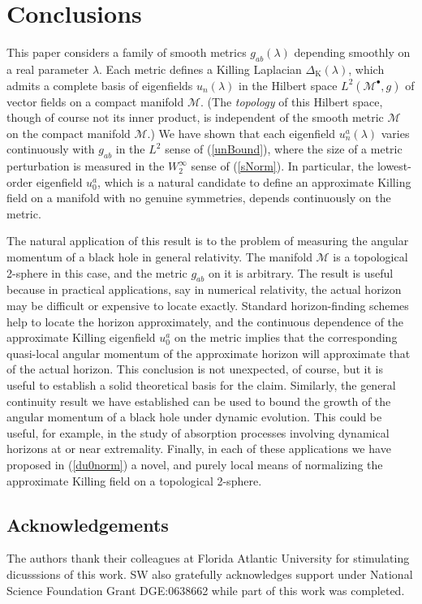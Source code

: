 \documentclass[12pt,letterpaper]{iopart}
\newcommand\Lap[1][K]{\Delta_{\scriptscriptstyle\mathrm{#1}}}
\newcommand\M{\mathcal{M}}
\newcommand\ind{{\bullet}}
\begin{document}
\section{Conclusions}

This paper considers a family of smooth metrics $g_{ab}(\lambda)$ depending smoothly on a real parameter $\lambda$.  Each metric defines a Killing Laplacian $\Lap(\lambda)$, which admits a complete basis of eigenfields $u_n(\lambda)$ in the Hilbert space $L^2(\M^\ind, g)$ of vector fields on a compact manifold $\M$.  (The \textit{topology} of this Hilbert space, though of course not its inner product, is independent of the smooth metric $\M$ on the compact manifold $\M$.)  We have shown that each eigenfield $u_n^a(\lambda)$ varies continuously with $g_{ab}$ in the $L^2$ sense of (\ref{unBound}), where the size of a metric perturbation is measured in the $W_2^\infty$ sense of (\ref{sNorm}).  In particular, the lowest-order eigenfield $u_0^a$, which is a natural candidate to define an approximate Killing field on a manifold with no genuine symmetries, depends continuously on the metric.

The natural application of this result is to the problem of measuring the angular momentum of a black hole in general relativity.  The manifold $\M$ is a topological 2-sphere in this case, and the metric $g_{ab}$ on it is arbitrary.  The result is useful because in practical applications, say in numerical relativity, the actual horizon may be difficult or expensive to locate exactly.  Standard horizon-finding schemes \cite{Thornburg} help to locate the horizon approximately, and the continuous dependence of the approximate Killing eigenfield $u_0^a$ on the metric implies that the corresponding quasi-local angular momentum of the approximate horizon will approximate that of the actual horizon.  This conclusion is not unexpected, of course, but it is useful to establish a solid theoretical basis for the claim.  Similarly, the general continuity result we have established can be used to bound the growth of the angular momentum of a black hole under dynamic evolution.  This could be useful, for example, in the study of absorption processes involving dynamical horizons \cite{Ashtekar2004} at or near extremality.  Finally, in each of these applications we have proposed in (\ref{du0norm}) a novel, and purely local means of normalizing the approximate Killing field on a topological 2-sphere.  


\subsection*{Acknowledgements}
The authors thank their colleagues at Florida Atlantic University for stimulating dicusssions of this work.  SW also gratefully acknowledges support under National Science Foundation Grant DGE:0638662 while part of this work was completed.
\end{document}
